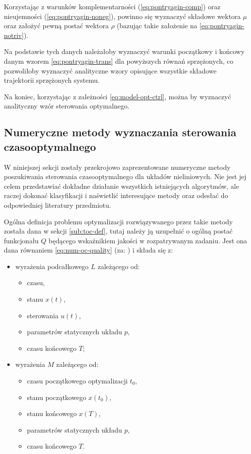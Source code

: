 Korzystając z warunków komplementarności (\ref{eq:pontryagin-comp}) oraz nieujemności (\ref{eq:pontryagin-noneg}), powinno się wyznaczyć składowe wektora $\mu$ oraz założyć pewną postać wektora $\rho$ (bazując takie założenie na \ref{eq:pontryagin-notriv}).

Na podstawie tych danych należałoby wyznaczyć warunki początkowy i końcowy danym wzorem \ref{eq:pontryagin-trans} dla powyższych równań sprzężonych, co pozwoliłoby wyznaczyć analityczne wzory opisujące wszystkie składowe trajektorii sprzężonych systemu.

Na koniec, korzystając z zależności \ref{eq:model-opt-ctrl}, można by wyznaczyć analityczny wzór sterowania optymalnego.


\subsection{Numeryczne metody wyznaczania sterowania czasooptymalnego}
\label{sub:toc-num}

W niniejszej sekcji zostały przekrojowo zaprezentowane numeryczne metody poszukiwania sterowania czasooptymalnego dla układów nieliniowych.
Nie jest jej celem przedstawiać dokładne działanie wszystkich istniejących algorytmów, ale raczej dokonać klasyfikacji i naświetlić interesujące metody oraz odesłać do odpowiedniej literatury przedmiotu.

Ogólna definicja problemu optymalizacji rozwiązywanego przez takie metody została dana w sekcji \ref{sub:toc-def}, tutaj należy ją uzupełnić o ogólną postać funkcjonału $Q$ będącego wskaźnikiem jakości w rozpatrywanym zadaniu. Jest ona dana równaniem \ref{eq:num-oc-quality} (za: \cite{Rao2010}) i składa się z:
\begin{itemize}
    \item wyrażenia podcałkowego $L$ zależącego od:
    \begin{itemize}
        \item czasu,
        \item stanu $x(t)$,
        \item sterowania $u(t)$,
        \item parametrów statycznych układu $p$,
        \item czasu końcowego $T$;
    \end{itemize}
    \item wyrażenia $M$ zależącego od:
    \begin{itemize}
        \item czasu początkowego optymalizacji $t_{0}$,
        \item stanu początkowego $x(t_{0})$,
        \item stanu końcowego $x(T)$,
        \item parametrów statycznych układu $p$,
        \item czasu końcowego $T$.
    \end{itemize}
\end{itemize}


